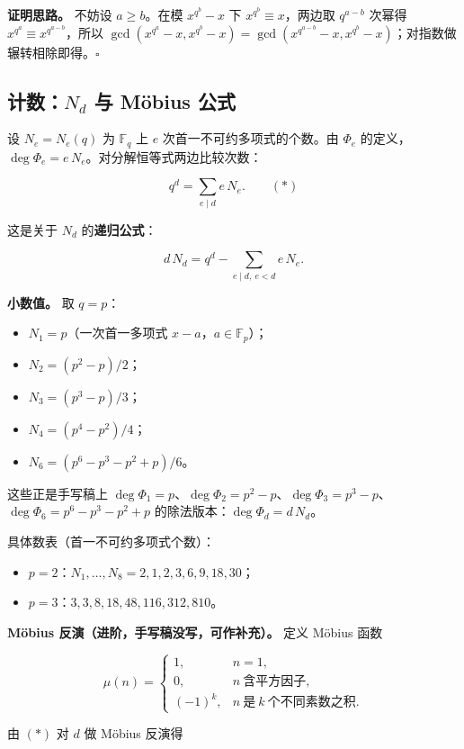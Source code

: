 \textbf{证明思路。} 不妨设 $a\ge b$。在模 $x^{q^b}-x$ 下 $x^{q^b}\equiv x$，两边取 $q^{a-b}$ 次幂得 $x^{q^a}\equiv x^{q^{a-b}}$，所以 $\gcd(x^{q^a}-x,x^{q^b}-x)=\gcd(x^{q^{a-b}}-x,x^{q^b}-x)$；对指数做辗转相除即得。$\square$

\subsection{计数：$N_d$ 与 Möbius 公式}


设 $N_e=N_e(q)$ 为 $\mathbb F_q$ 上 $e$ 次首一不可约多项式的个数。由 $\Phi_e$ 的定义，$\deg\Phi_e=e\,N_e$。对分解恒等式两边比较次数：

\[
q^d=\sum_{e\mid d} e\,N_e .
\qquad(\ast)
\]

这是关于 $N_d$ 的\textbf{递归公式}：

\[
d\,N_d=q^d-\sum_{e\mid d,\ e<d} e\,N_e .
\]

\textbf{小数值。} 取 $q=p$：

\begin{itemize}
\item $N_1=p$（一次首一多项式 $x-a$，$a\in\mathbb F_p$）；
\item $N_2=(p^2-p)/2$；
\item $N_3=(p^3-p)/3$；
\item $N_4=(p^4-p^2)/4$；
\item $N_6=(p^6-p^3-p^2+p)/6$。
\end{itemize}


这些正是手写稿上 $\deg\Phi_1=p$、$\deg\Phi_2=p^2-p$、$\deg\Phi_3=p^3-p$、$\deg\Phi_6=p^6-p^3-p^2+p$ 的除法版本：$\deg\Phi_d=d\,N_d$。

具体数表（首一不可约多项式个数）：

\begin{itemize}
\item $p=2$：$N_1,\dots,N_8=2,1,2,3,6,9,18,30$；
\item $p=3$：$3,3,8,18,48,116,312,810$。
\end{itemize}


\textbf{Möbius 反演（进阶，手写稿没写，可作补充）。} 定义 Möbius 函数

\[
\mu(n)=
\begin{cases}
1, & n=1,\\
0, & n\ \text{含平方因子},\\
(-1)^k, & n\ \text{是}\ k\ \text{个不同素数之积}.
\end{cases}
\]

由 $(\ast)$ 对 $d$ 做 Möbius 反演得

